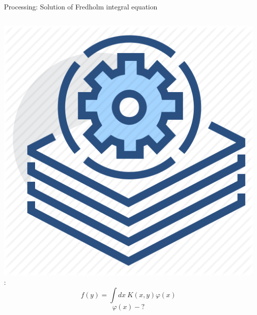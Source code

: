 \documentclass[8pt,pdf,hyperref={unicode}]{beamer}
\begin{document}
\begin{frame}
\begin{block}{Processing: Solution of Fredholm integral equation}
\begin{columns}
             \includegraphics[width=\textwidth]{image/batch_processing.png}
             \Huge{:}
             \LARGE{
                 $$
                 f(y) = \int dx~ K(x,y)\varphi(x)
                 $$
                 $$
                 \varphi(x) - ?
                 $$
                } 
         \end{columns}
        \end{block}
\end{frame}
\end{document}
